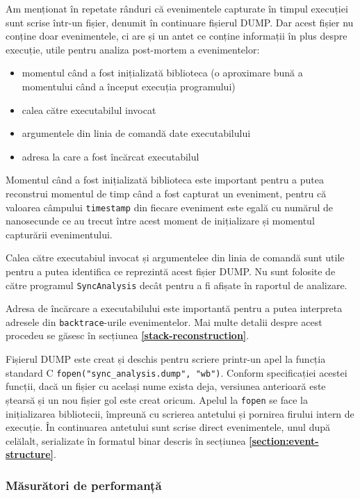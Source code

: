 Am menționat în repetate rânduri că evenimentele capturate în timpul
execuției sunt scrise într-un fișier, denumit în continuare fișierul
DUMP. Dar acest fișier nu conține doar evenimentele, ci are și un antet
ce conține informații în plus despre execuție, utile pentru analiza
post-mortem a evenimentelor:
\begin{itemize}
    \item momentul când a fost inițializată biblioteca (o aproximare
    bună a momentului când a început execuția programului)
    \item calea către executabilul invocat
    \item argumentele din linia de comandă date executabilului
    \item adresa la care a fost încărcat executabilul
\end{itemize}

Momentul când a fost inițializată biblioteca este important pentru a
putea reconstrui momentul de timp când a fost capturat un eveniment,
pentru că valoarea câmpului \lstinline{timestamp} din fiecare eveniment
este egală cu numărul de nanosecunde ce au trecut între acest moment de
inițializare și momentul capturării evenimentului.

Calea către executabiul invocat și argumentelee din linia de comandă
sunt utile pentru a putea identifica ce reprezintă acest fișier DUMP. Nu
sunt folosite de către programul \lstinline{SyncAnalysis} decât pentru a
fi afișate în raportul de analizare.

Adresa de încărcare a executabilului este importantă pentru a putea
interpreta adresele din \lstinline{backtrace}-urile evenimentelor. Mai
multe detalii despre acest procedeu se găsesc în secțiunea 
\textbf{\ref{stack-reconstruction}}.

Fișierul DUMP este creat și deschis pentru scriere printr-un apel la
funcția standard C \lstinline{fopen("sync_analysis.dump", "wb")}.
Conform specificației acestei funcții, dacă un fișier cu același nume
exista deja, versiunea anterioară este ștearsă și un nou fișier gol este
creat oricum. Apelul la \lstinline{fopen} se face la inițializarea
bibliotecii, împreună cu scrierea antetului și pornirea firului intern
de execuție. În continuarea antetului sunt scrise direct evenimentele,
unul după celălalt, serializate în formatul binar descris în secțiunea
\textbf{\ref{section:event-structure}}.

\subsubsection{Măsurători de performanță}\label{library-performance}

